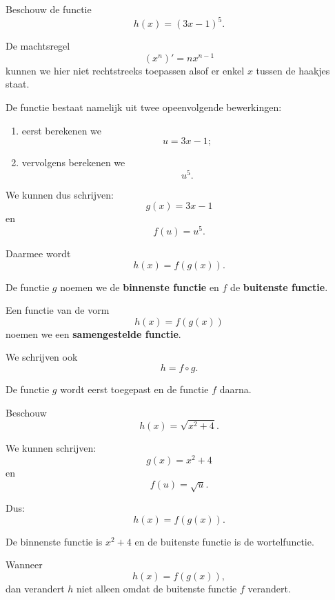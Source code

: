 \documentclass{ximera}
\begin{document}


Beschouw de functie
\[h(x)=(3x-1)^5.\]

De machtsregel
\[(x^n)'=nx^{n-1}\]
kunnen we hier niet rechtstreeks toepassen alsof er enkel $x$ tussen
de haakjes staat.

De functie bestaat namelijk uit twee opeenvolgende bewerkingen:

\begin{enumerate}
  \item eerst berekenen we
        \[u=3x-1;\]
  \item vervolgens berekenen we
        \[u^5.\]
\end{enumerate}

We kunnen dus schrijven:
\[g(x)=3x-1\]
en
\[f(u)=u^5.\]

Daarmee wordt
\[h(x)=f(g(x)).\]

De functie $g$ noemen we de \textbf{binnenste functie} en $f$ de
\textbf{buitenste functie}.


\begin{definitie}
Een functie van de vorm
\[h(x)=f(g(x))\]
noemen we een \textbf{samengestelde functie}.

We schrijven ook
\[h=f\circ g.\]

De functie $g$ wordt eerst toegepast en de functie $f$ daarna.
\end{definitie}


\begin{voorbeeld}
Beschouw
\[h(x)=\sqrt{x^2+4}.\]

We kunnen schrijven:
\[g(x)=x^2+4\]
en
\[f(u)=\sqrt{u}.\]

Dus:
\[h(x)=f(g(x)).\]

De binnenste functie is $x^2+4$ en de buitenste functie is de
wortelfunctie.
\end{voorbeeld}




Wanneer
\[h(x)=f(g(x)),\]
dan verandert $h$ niet alleen omdat de buitenste functie $f$ verandert.
\end{document}
